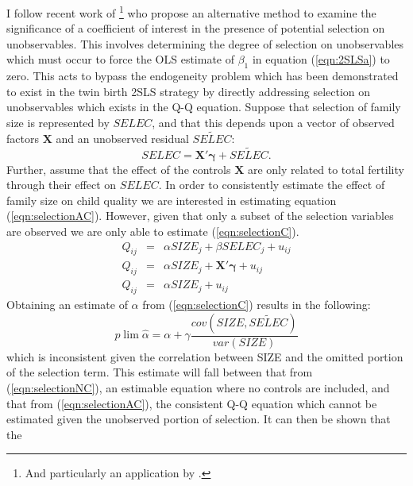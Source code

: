 \documentclass{article}[11pt,subeqn]
\newcommand{\vect}[1]{\mathbf{#1}}
\begin{document}
\begin{spacing}{1.5}
I follow recent work of \citet{Altonjietal2005, Altonjietal2008}\footnote{And particularly an application by \citet{BellowsMiguel2008}.} who propose an alternative method to examine the 
significance of a coefficient of interest in the presence of 
potential selection on unobservables.  This involves determining the degree of selection on unobservables which must occur to force the OLS estimate of $\beta_1$ in equation 
(\ref{eqn:2SLSa}) to zero.  This acts to bypass the endogeneity problem which has been demonstrated to exist in the twin birth 2SLS strategy by directly addressing selection on 
unobservables which exists in the Q-Q equation. Suppose that selection of family size is represented by $SELEC$, and that this depends upon a vector of observed factors $\vect{X}$
and an unobserved residual $\widetilde{SELEC}$:  %
\begin{equation}
SELEC=\vect{X'\gamma}+ \widetilde{SELEC}.
\end{equation}
Further, assume that the effect of the controls $\vect{X}$ are only related to total fertility through their effect on $SELEC$.   In order to consistently estimate the effect of 
family size on child quality we are interested in estimating equation 
(\ref{eqn:selectionAC}).  However, given that only a subset of the selection variables are observed we are only able to estimate (\ref{eqn:selectionC}).
\begin{subequations}
\label{eqn:selection}
\begin{eqnarray}
Q_{ij}&=&\alpha SIZE_{j}+\beta SELEC_j+u_{ij} \label{eqn:selectionAC}\\
Q_{ij}&=&\alpha SIZE_{j}+\vect{X'\gamma}+u_{ij} \label{eqn:selectionC}\\
Q_{ij}&=&\alpha SIZE_{j}+u_{ij} \label{eqn:selectionNC}
\end{eqnarray}
\end{subequations}
Obtaining an estimate of $\alpha$ from (\ref{eqn:selectionC}) results in the following:
\begin{equation}
\label{eqn:biasC}
 p\lim \hat\alpha=\alpha + \gamma\frac{cov(SIZE,\widetilde{SELEC})}{var(SIZE)}
\end{equation}
which is inconsistent given the correlation between SIZE and the omitted portion of the selection term.  This estimate will fall between that from (\ref{eqn:selectionNC}), an estimable equation where
no controls are included, and that from (\ref{eqn:selectionAC}), the consistent Q-Q equation which cannot be estimated given the unobserved portion of selection.  It can then be shown that the

\end{spacing}
\end{document}
